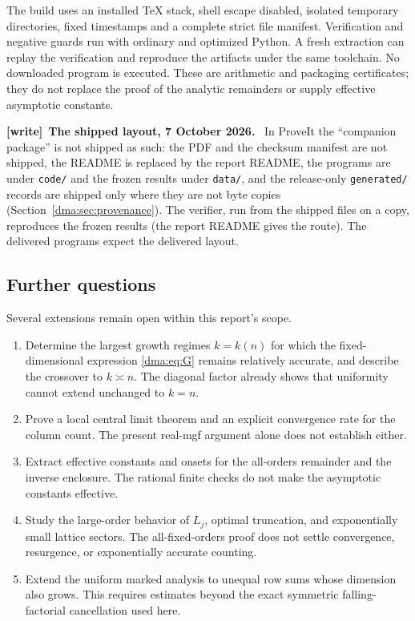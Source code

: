 \documentclass[11pt,letterpaper]{article}
\theoremstyle{remark}\newtheorem{remark}[theorem]{Remark}
\newcommand{\file}[1]{\nolinkurl{#1}}
\newenvironment{writenote}[1][]{\par\smallskip\begingroup\small
 \noindent\textbf{[write]}\if\relax\detokenize{#1}\relax\else~\textbf{#1.}\fi\ }%
 {\par\endgroup\smallskip}
\begin{document}
The build uses an installed TeX stack, shell escape disabled, isolated temporary directories, fixed timestamps and a complete strict file manifest. Verification and negative guards run with ordinary and optimized Python. A fresh extraction can replay the verification and reproduce the artifacts under the same toolchain. No downloaded program is executed. These are arithmetic and packaging certificates; they do not replace the proof of the analytic remainders or supply effective asymptotic constants.

\begin{writenote}[The shipped layout, 7 October 2026]
In ProveIt the ``companion package'' is not shipped as such: the PDF and the
checksum manifest are not shipped, the README is replaced by the report
README, the programs are under \file{code/} and the frozen results under
\file{data/}, and the release-only \file{generated/} records are shipped only
where they are not byte copies (Section~\ref{dma:sec:provenance}). The
verifier, run from the shipped files on a copy, reproduces the frozen results
(the report README gives the route). The delivered programs expect the
delivered layout.
\end{writenote}

\subsection{Further questions}
Several extensions remain open within this report's scope.
\begin{enumerate}[label=\arabic*.]
\item Determine the largest growth regimes $k=k(n)$ for which the fixed-dimensional expression \eqref{dma:eq:G} remains relatively accurate, and describe the crossover to $k\asymp n$. The diagonal factor already shows that uniformity cannot extend unchanged to $k=n$.
\item Prove a local central limit theorem and an explicit convergence rate for the column count. The present real-mgf argument alone does not establish either.
\item Extract effective constants and onsets for the all-orders remainder and the inverse enclosure. The rational finite checks do not make the asymptotic constants effective.
\item Study the large-order behavior of $L_j$, optimal truncation, and exponentially small lattice sectors. The all-fixed-orders proof does not settle convergence, resurgence, or exponentially accurate counting.
\item Extend the uniform marked analysis to unequal row sums whose dimension also grows. This requires estimates beyond the exact symmetric falling-factorial cancellation used here.
\end{enumerate}
\end{document}
